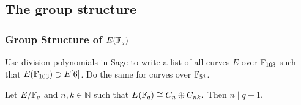 \documentclass[10pt,handout]{beamer} %
\begin{document}
\subsection{The group structure}
\begin{frame}\frametitle{Group Structure of $E(\mathbb F_q)$}

\begin{exercise} Use division polynomials in Sage to write a list of all curves $E$ over $\mathbb F_{103}$
such that $E(\mathbb F_{103})\supset E[6]$. Do the same for curves over $\mathbb F_{5^4}$.
\end{exercise}\pause

\pause

\begin{theorem}  Let $E/\mathbb F_q$ and $n,k\in\mathbb N$ such that
$E(\mathbb F_q)\cong C_n\oplus C_{nk}.$
Then $n\mid q-1$.
\end{theorem}
\end{frame}
\end{document}
